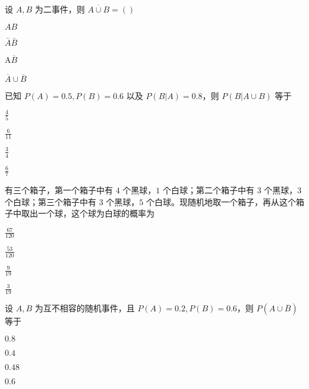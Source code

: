 \documentclass{exam-zh}
\begin{document}
\begin{question}
  设 $A, B$ 为二事件，则 $\overline{A \cup B} = ( )$ \paren[B]
  \begin{choices}
    \item $AB$  
    \item $\bar{A}\bar{B}$  
    \item A$\overline{B}$  
    \item $\overline{A} \cup \overline{B}$  
  \end{choices}
\end{question}

\begin{question}
  已知 $P(A) = 0.5, P(B) = 0.6$ 以及 $P(B|A) = 0.8$，则  
  $P(B|A \cup B)$ 等于 \paren[D]
  \begin{choices}
    \item $\frac{4}{5}$  
    \item $\frac{6}{11}$  
    \item $\frac{3}{4}$  
    \item $\frac{6}{7}$  
  \end{choices}
\end{question}

\begin{question}
  有三个箱子，第一个箱子中有 $4$ 个黑球，$1$ 个白球；第二个箱子中有 $3$ 个黑球，$3$ 个白球；第三个箱子中有 $3$ 个黑球，$5$ 个白球。现随机地取一个箱子，再从这个箱子中取出一个球，这个球为白球的概率为 \paren[B]
  \begin{choices}
    \item $\frac{67}{120}$  
    \item $\frac{53}{120}$  
    \item $\frac{9}{19}$  
    \item $\frac{3}{19}$  
  \end{choices}
\end{question}

\begin{question}
  设 $A, B$ 为互不相容的随机事件，且  
  $P(A) = 0.2, P(B) = 0.6$，则 $P(A \cup \overline{B})$ 等于 \paren[B]
  \begin{choices}
    \item $0.8$  
    \item $0.4$  
    \item $0.48$  
    \item $0.6$  
  \end{choices}
\end{question}
\end{document}
